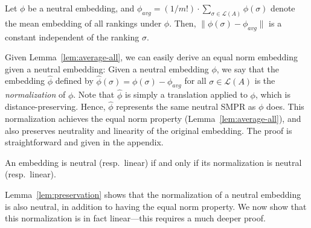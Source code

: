 \documentclass[prodmode,acmec]{ec-acmsmall}
\newcommand{\calL}{{\mathcal{L}}}
\newcommand{\rank}{{\calL(A)}}
\begin{document}
\begin{lemma}
Let $\phi$ be a neutral embedding, and $\phi_{avg} = (1/m!) \cdot \sum_{\sigma \in \rank} \phi(\sigma)$ denote the mean embedding of all rankings under $\phi$. Then, $\|\phi(\sigma)-\phi_{avg}\|$ is a constant independent of the ranking $\sigma$.
\label{lem:average-all}
\end{lemma}
%
Given Lemma~\ref{lem:average-all}, we can easily derive an equal norm embedding given a neutral embedding: Given a neutral embedding $\phi$, we say that the embedding $\hat{\phi}$ defined by $\hat{\phi}(\sigma) = \phi(\sigma) - \phi_{avg}$ for all $\sigma \in \rank$ is the \emph{normalization} of $\phi$. Note that $\hat{\phi}$ is simply a translation applied to $\phi$, which is distance-preserving. Hence, $\hat{\phi}$ represents the same neutral SMPR as $\phi$ does. This normalization achieves the equal norm property (Lemma~\ref{lem:average-all}), and also preserves neutrality and linearity of the original embedding. The proof is straightforward and given in the appendix.


\begin{lemma}
An embedding is neutral (resp.\ linear) if and only if its normalization is neutral (resp.\ linear). 
\label{lem:preservation}
\end{lemma}
%
Lemma~\ref{lem:preservation} shows that the normalization of a neutral embedding is also neutral, in addition to having the equal norm property. We now show that this normalization is in fact linear---this requires a much deeper proof. 
\end{document}
